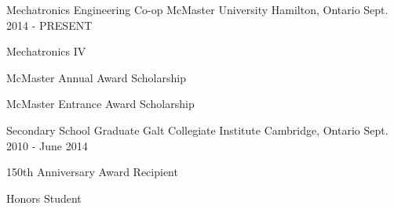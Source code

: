 
\begin{cventries}

  \cventry
    {Mechatronics Engineering Co-op} %
    {McMaster University} %
    {Hamilton, Ontario} %
    {Sept. 2014 - PRESENT} %
    {
      \begin{cvitems} %
        \item {Mechatronics IV}
        \item {McMaster Annual Award Scholarship}
        \item {McMaster Entrance Award Scholarship}
      \end{cvitems}
    }

\cventry
    {Secondary School Graduate} %
    {Galt Collegiate Institute} %
    {Cambridge, Ontario} %
    {Sept. 2010 - June 2014} %
    {
      \begin{cvitems} %
        \item {150th Anniversary Award Recipient}
        \item {Honors Student}
      \end{cvitems}
    }

\end{cventries}
